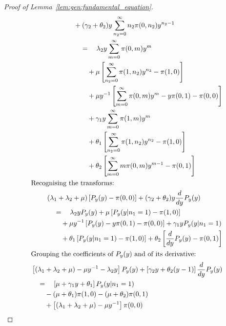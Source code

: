 \begin{proof}[Proof of Lemma~\ref{lem:gen:fundamental_equation}]
\begin{align}
\begin{split}
            & + (\gamma_2 + \theta_2) y \sum_{n_2=0}^{\infty} n_2 \pi(0, n_2) y^{n_2-1} \\
            & \quad = \quad \lambda_2 y \sum_{m=0}^{\infty} \pi(0, m) y^{m} \\
            & \quad \quad + \mu \left[ \sum_{n_2=0}^{\infty} \pi(1, n_2) y^{n_2} - \pi(1, 0) \right] \\
            & \quad \quad + \mu y^{-1} \left[ \sum_{m=0}^{\infty} \pi(0, m) y^{m} - y \pi(0, 1) - \pi(0, 0) \right] \\
            & \quad \quad + \gamma_1 y \sum_{m=0}^{\infty} \pi(1, m) y^{m} \\
            & \quad \quad + \theta_1 \left[ \sum_{n_2=0}^{\infty} \pi(1, n_2) y^{n_2} - \pi(1, 0) \right] \\
            & \quad \quad + \theta_2 \left[ \sum_{m=0}^{\infty} m \pi(0, m) y^{m-1} - \pi(0, 1) \right]
        \end{split} \nonumber \\
        \intertext{Recognising the transforms:}
        \begin{split}
            & (\lambda_1 + \lambda_2 + \mu) \left[ P_y(y) - \pi(0, 0) \right]
            + (\gamma_2 + \theta_2) y \frac{d}{dy} P_y(y) \\
            & \quad = \quad \lambda_2 y P_y(y)
            + \mu \left[ P_y(y | n_1=1) - \pi(1, 0) \right] \\
            & \quad \quad + \mu y^{-1} \left[ P_y(y) - y \pi(0, 1) - \pi(0, 0) \right]
            + \gamma_1 y P_y(y | n_1=1) \\
            & \quad \quad + \theta_1 \left[ P_y(y | n_1=1) - \pi(1, 0) \right]
            + \theta_2 \left[ \frac{d}{dy} P_y(y) - \pi(0, 1) \right]
        \end{split} \nonumber \\
        \intertext{Grouping the coefficients of $P_y(y)$ and of its derivative:}
        \begin{split}
            & \left[ (\lambda_1 + \lambda_2 + \mu) - \mu y^{-1} - \lambda_2 y \right] P_y(y)
            + \left[ \gamma_2 y + \theta_2(y-1) \right] \frac{d}{dy} P_y(y) \\
            & \quad = \quad \left[ \mu + \gamma_1 y + \theta_1 \right] P_y(y | n_1=1) \\
            & \quad \quad - (\mu + \theta_1) \pi(1, 0)
            - (\mu + \theta_2) \pi(0, 1) \\
            & \quad \quad + \left[ (\lambda_1 + \lambda_2 + \mu) - \mu y^{-1} \right] \pi(0, 0)

\end{split}
\end{align}
\end{proof}
